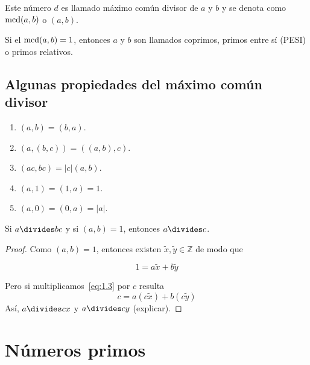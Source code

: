 \begin{definition}
Este número $d$ es llamado máximo común divisor de $a$ y $b$ y se denota como $\operatorname{mcd}(a,b)$ o $(a,b)$.
\end{definition}

\begin{remark}
Si el $\operatorname{mcd}(a,b)=1$, entonces $a$ y $b$ son llamados coprimos, primos entre sí (PESI) o primos relativos.
\end{remark}

\subsection{Algunas propiedades del máximo común divisor}

\begin{enumerate}[font={\bfseries},label={\arabic*)}]

\item $(a,b)=(b,a)$.

\item $(a,(b,c))=((a,b),c)$.

\item $(ac,bc)=|c|(a,b)$.

\item $(a,1)=(1,a)=1$.

\item $(a,0)=(0,a)=|a|$.
\end{enumerate}

\begin{theorem}

Si $a\divides bc$ y si $(a,b)=1$, entonces $a\divides c$.
\begin{proof}
Como $(a,b)=1$, entonces existen $\tilde{x},\tilde{y}\in\mathbb{Z}$ de modo que

\begin{equation}\label{eq:1.3}
1=a\tilde{x}+b\tilde{y}
\end{equation}

\noindent
Pero si multiplicamos~\eqref{eq:1.3} por $c$ resulta
\begin{equation}
c=a(c\tilde{x})+b(c\tilde{y})
\end{equation}
Así, $a\divides cx$ y $a\divides cy$ (explicar).

\end{proof}

\end{theorem}

\section{Números primos}

